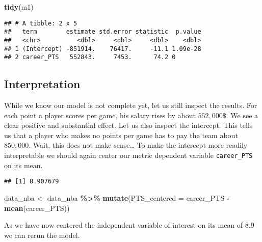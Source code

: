 \documentclass[
]{book}
\newenvironment{Shaded}{\begin{snugshade}}{\end{snugshade}}
\newcommand{\AttributeTok}[1]{\textcolor[rgb]{0.13,0.29,0.53}{#1}}
\newcommand{\FunctionTok}[1]{\textcolor[rgb]{0.13,0.29,0.53}{\textbf{#1}}}
\newcommand{\NormalTok}[1]{#1}
\newcommand{\OtherTok}[1]{\textcolor[rgb]{0.56,0.35,0.01}{#1}}
\newcommand{\SpecialCharTok}[1]{\textcolor[rgb]{0.81,0.36,0.00}{\textbf{#1}}}
\begin{document}
\begin{Shaded}
\begin{Highlighting}[]
\FunctionTok{tidy}\NormalTok{(m1)}
\end{Highlighting}
\end{Shaded}

\begin{verbatim}
## # A tibble: 2 x 5
##   term        estimate std.error statistic  p.value
##   <chr>          <dbl>     <dbl>     <dbl>    <dbl>
## 1 (Intercept) -851914.    76417.     -11.1 1.09e-28
## 2 career_PTS   552843.     7453.      74.2 0
\end{verbatim}

\hypertarget{interpretation}{%
\subsection{Interpretation}\label{interpretation}}

While we know our model is not complete yet, let us still inspect the results.
For each point a player scores per game, his salary rises by about \(552,000\$\).
We see a clear positive and substantial effect. Let us also inspect the
intercept. This tells us that a player who makes no points per game has to pay
the team about \(850,000\). Wait, this does not make sense\ldots{}
To make the intercept more readily interpretable we should again center our
metric dependent variable \texttt{career\_PTS} on its mean.

\begin{Shaded}
\end{Shaded}

\begin{verbatim}
## [1] 8.907679
\end{verbatim}

\begin{Shaded}
\begin{Highlighting}[]
\NormalTok{data\_nba }\OtherTok{\textless{}{-}}\NormalTok{ data\_nba }\SpecialCharTok{\%\textgreater{}\%} 
  \FunctionTok{mutate}\NormalTok{(}\AttributeTok{PTS\_centered =}\NormalTok{ career\_PTS }\SpecialCharTok{{-}} \FunctionTok{mean}\NormalTok{(career\_PTS))}
\end{Highlighting}
\end{Shaded}

As we have now centered the independent variable of interest on its mean of \(8.9\)
we can rerun the model.
\end{document}
